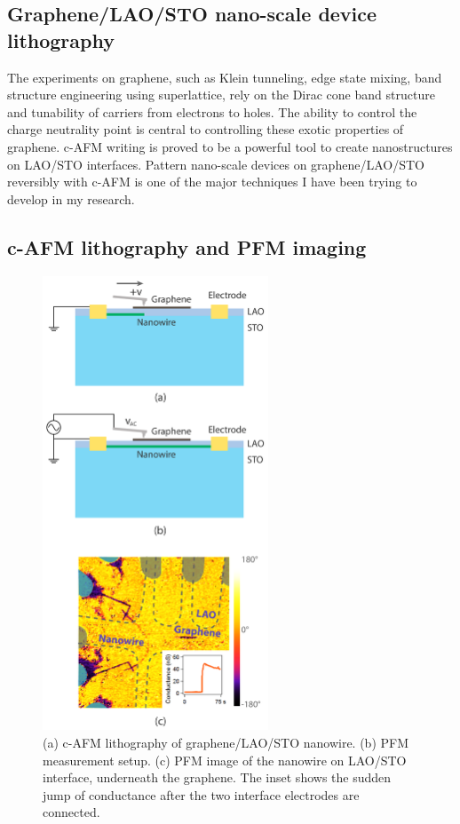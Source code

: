 \documentclass[pdflatex, sectionletters, 12pt]{pittetd}    %
\begin{document}

\subsection{Graphene/LAO/STO nano-scale device lithography}

The experiments on graphene, such as Klein tunneling\cite{allain2011klein, katsnelson2006chiral, young2009quantum, shytov2008klein}, edge state mixing\cite{williams2007quantum, abanin2007quantized, lohmann2009four, amet2014selective}, band structure engineering using superlattice\cite{forsythe2018band}, rely on the Dirac cone band structure and tunability of carriers from electrons to holes. The ability to control the charge neutrality point is central to controlling these exotic properties of graphene. c-AFM writing is proved to be a powerful tool to create nanostructures on LAO/STO interfaces. Pattern nano-scale devices on graphene/LAO/STO reversibly with c-AFM is one of the major techniques I have been trying to develop in my research. 

\subsection{c-AFM lithography and PFM imaging}
\begin{figure}[p]
	\centering
	\includegraphics[width=0.6\textwidth]{Drawing/GraphenePFM.pdf}
	\caption{(a) c-AFM lithography of graphene/LAO/STO nanowire. (b) PFM measurement setup. (c) PFM image of the nanowire on LAO/STO interface, underneath the graphene. The inset shows the sudden jump of conductance after the two interface electrodes are connected.}
	\label{FIG:GraphenePFM}
\end{figure}
\end{document}

